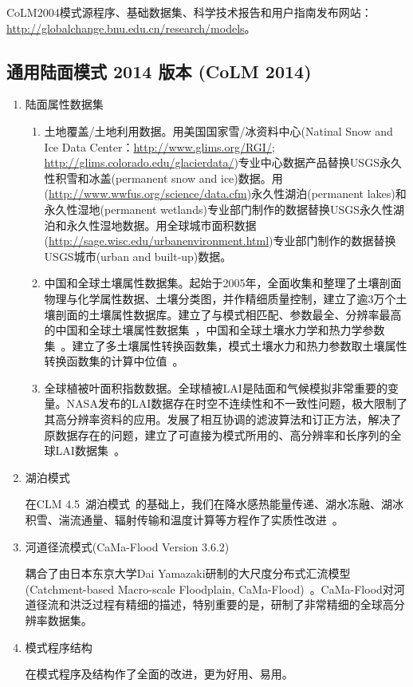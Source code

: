 CoLM2004模式源程序、基础数据集、科学技术报告和用户指南发布网站： \url{http://globalchange.bnu.edu.cn/research/models}。


\subsection{通用陆面模式 2014 版本 (CoLM 2014)}
\begin{enumerate}[label={\arabic*)}]
    \item 陆面属性数据集
    \begin{enumerate}[label={\alph*)}]
    \item 土地覆盖/土地利用数据。用美国国家雪/冰资料中心(Natinal Snow and Ice Data Center：\url{http://www.glims.org/RGI/}; \url{http://glims.colorado.edu/glacierdata/})专业中心数据产品替换USGS永久性积雪和冰盖(permanent snow and ice)数据。用(\url{http://www.wwfus.org/science/data.cfm})永久性湖泊(permanent lakes)和永久性湿地(permanent wetlands)专业部门制作的数据替换USGS永久性湖泊和永久性湿地数据。用全球城市面积数据(\url{http://sage.wisc.edu/urbanenvironment.html})专业部门制作的数据替换USGS城市(urban and built-up)数据。
    \item 中国和全球土壤属性数据集。起始于2005年，全面收集和整理了土壤剖面物理与化学属性数据、土壤分类图，并作精细质量控制，建立了逾3万个土壤剖面的土壤属性数据库。建立了与模式相匹配、参数最全、分辨率最高的中国和全球土壤属性数据集~\citep{shangguan2013china,shangguan2014global}，中国和全球土壤水力学和热力学参数集~\citep{dai2013development}。建立了多土壤属性转换函数集，模式土壤水力和热力参数取土壤属性转换函数集的计算中位值~\citep{dai2013development}。
    \item 全球植被叶面积指数数据。全球植被LAI是陆面和气候模拟非常重要的变量。NASA发布的LAI数据存在时空不连续性和不一致性问题，极大限制了其高分辨率资料的应用。发展了相互协调的滤波算法和订正方法，解决了原数据存在的问题，建立了可直接为模式所用的、高分辨率和长序列的全球LAI数据集~\citep{yuan2011reprocessing}。
    \end{enumerate}
    \item 湖泊模式

    在CLM 4.5~\citep{oleson2013technical}湖泊模式~\citep{subin2012improved}的基础上，我们在降水感热能量传递、湖水冻融、湖冰积雪、湍流通量、辐射传输和温度计算等方程作了实质性改进~\citep{戴永久2018通用陆面模式}。
    
    \item 河道径流模式(CaMa-Flood Version 3.6.2)

    耦合了由日本东京大学Dai Yamazaki研制的大尺度分布式汇流模型  (Catchment-based Macro-scale Floodplain, CaMa-Flood)~\citep{yamazaki2011physically}。CaMa-Flood对河道径流和洪泛过程有精细的描述，特别重要的是，研制了非常精细的全球高分辨率数据集。

    \item 模式程序结构

    在模式程序及结构作了全面的改进，更为好用、易用。
\end{enumerate}

